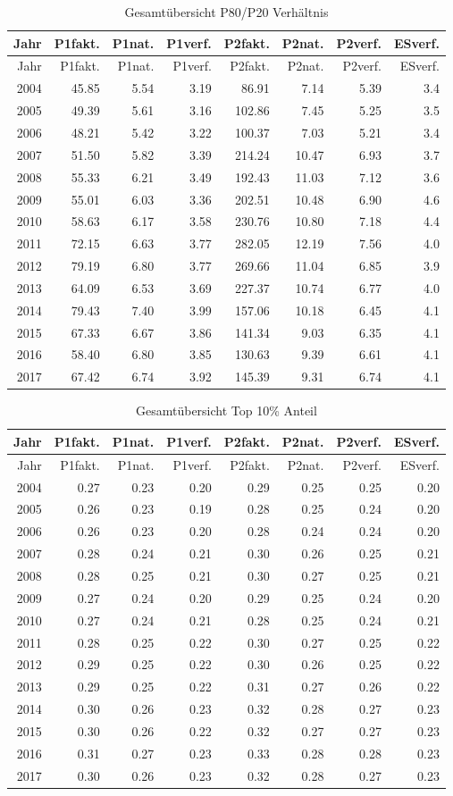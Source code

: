 \documentclass[12pt,]{article}
\begin{document}
\begin{longtable}[]{@{}rrrrrrrr@{}}
\caption{Gesamtübersicht P80/P20 Verhältnis}\tabularnewline
\toprule
Jahr & P1fakt. & P1nat. & P1verf. & P2fakt. & P2nat. & P2verf. &
ESverf.\tabularnewline
\midrule
\endfirsthead
\toprule
Jahr & P1fakt. & P1nat. & P1verf. & P2fakt. & P2nat. & P2verf. &
ESverf.\tabularnewline
\midrule
\endhead
2004 & 45.85 & 5.54 & 3.19 & 86.91 & 7.14 & 5.39 & 3.4\tabularnewline
2005 & 49.39 & 5.61 & 3.16 & 102.86 & 7.45 & 5.25 & 3.5\tabularnewline
2006 & 48.21 & 5.42 & 3.22 & 100.37 & 7.03 & 5.21 & 3.4\tabularnewline
2007 & 51.50 & 5.82 & 3.39 & 214.24 & 10.47 & 6.93 & 3.7\tabularnewline
2008 & 55.33 & 6.21 & 3.49 & 192.43 & 11.03 & 7.12 & 3.6\tabularnewline
2009 & 55.01 & 6.03 & 3.36 & 202.51 & 10.48 & 6.90 & 4.6\tabularnewline
2010 & 58.63 & 6.17 & 3.58 & 230.76 & 10.80 & 7.18 & 4.4\tabularnewline
2011 & 72.15 & 6.63 & 3.77 & 282.05 & 12.19 & 7.56 & 4.0\tabularnewline
2012 & 79.19 & 6.80 & 3.77 & 269.66 & 11.04 & 6.85 & 3.9\tabularnewline
2013 & 64.09 & 6.53 & 3.69 & 227.37 & 10.74 & 6.77 & 4.0\tabularnewline
2014 & 79.43 & 7.40 & 3.99 & 157.06 & 10.18 & 6.45 & 4.1\tabularnewline
2015 & 67.33 & 6.67 & 3.86 & 141.34 & 9.03 & 6.35 & 4.1\tabularnewline
2016 & 58.40 & 6.80 & 3.85 & 130.63 & 9.39 & 6.61 & 4.1\tabularnewline
2017 & 67.42 & 6.74 & 3.92 & 145.39 & 9.31 & 6.74 & 4.1\tabularnewline
\bottomrule
\end{longtable}

\begin{longtable}[]{@{}rrrrrrrr@{}}
\caption{Gesamtübersicht Top 10\% Anteil}\tabularnewline
\toprule
Jahr & P1fakt. & P1nat. & P1verf. & P2fakt. & P2nat. & P2verf. &
ESverf.\tabularnewline
\midrule
\endfirsthead
\toprule
Jahr & P1fakt. & P1nat. & P1verf. & P2fakt. & P2nat. & P2verf. &
ESverf.\tabularnewline
\midrule
\endhead
2004 & 0.27 & 0.23 & 0.20 & 0.29 & 0.25 & 0.25 & 0.20\tabularnewline
2005 & 0.26 & 0.23 & 0.19 & 0.28 & 0.25 & 0.24 & 0.20\tabularnewline
2006 & 0.26 & 0.23 & 0.20 & 0.28 & 0.24 & 0.24 & 0.20\tabularnewline
2007 & 0.28 & 0.24 & 0.21 & 0.30 & 0.26 & 0.25 & 0.21\tabularnewline
2008 & 0.28 & 0.25 & 0.21 & 0.30 & 0.27 & 0.25 & 0.21\tabularnewline
2009 & 0.27 & 0.24 & 0.20 & 0.29 & 0.25 & 0.24 & 0.20\tabularnewline
2010 & 0.27 & 0.24 & 0.21 & 0.28 & 0.25 & 0.24 & 0.21\tabularnewline
2011 & 0.28 & 0.25 & 0.22 & 0.30 & 0.27 & 0.25 & 0.22\tabularnewline
2012 & 0.29 & 0.25 & 0.22 & 0.30 & 0.26 & 0.25 & 0.22\tabularnewline
2013 & 0.29 & 0.25 & 0.22 & 0.31 & 0.27 & 0.26 & 0.22\tabularnewline
2014 & 0.30 & 0.26 & 0.23 & 0.32 & 0.28 & 0.27 & 0.23\tabularnewline
2015 & 0.30 & 0.26 & 0.22 & 0.32 & 0.27 & 0.27 & 0.23\tabularnewline
2016 & 0.31 & 0.27 & 0.23 & 0.33 & 0.28 & 0.28 & 0.23\tabularnewline
2017 & 0.30 & 0.26 & 0.23 & 0.32 & 0.28 & 0.27 & 0.23\tabularnewline
\bottomrule
\end{longtable}
\end{document}
